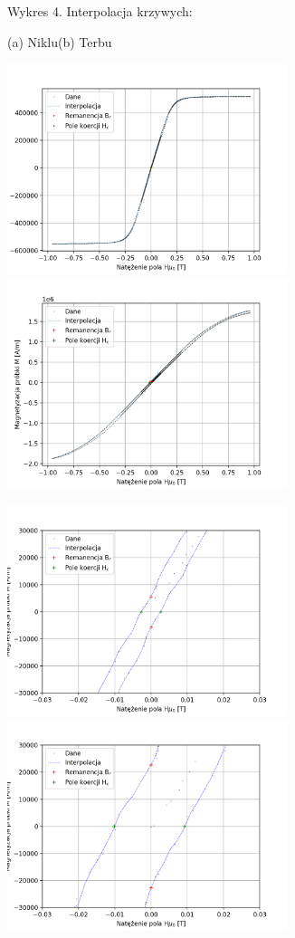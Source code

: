 \documentclass[a4paper]{article}
\begin{document}
\begin{figure}[H]
    \centering
    Wykres 4. Interpolacja krzywych:
    \vspace{0.6cm}
    
    (a) Niklu\hspace{7cm}(b) Terbu
    
    \includegraphics[width=8.2cm]{Ni_interp.png}
    \includegraphics[width=8.2cm]{Tb_interp.png}
    \label{fig:my_label}
\end{figure}

\begin{figure}[H]
    \centering
    \includegraphics[width=8.2cm]{Ni_max_and_min.png}
    \includegraphics[width=8.2cm]{Tb_max_and_min.png}
    \label{fig:my_label}
\end{figure}
\end{document}
